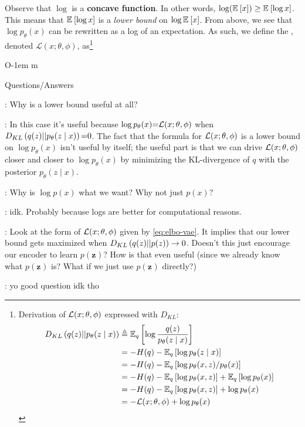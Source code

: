 \documentclass[11pt]{article}
\renewcommand\vec[2][]{\bm{#2}_{#1}}
\newcommand\QA[2]{\item \red{Q}: #1
	\begin{compactitem}
		\item \green{A}: #2
	\end{compactitem}}
\begin{document}
Observe that $\log$ is a \textbf{concave function}. In other words, $\log(\E{x}) \ge \E{\log x}$. This means that $\E{\log x}$ is a \textit{lower bound} on $\log \E{x}$. From above, we see that $\log p_{\theta}(x)$ can be rewritten as a log of an expectation. As such, we define the , denoted $\mathcal L(x; \theta, \phi)$, as\footnote{Derivation of $\elbo$ expressed with $D_{KL}$:
\begin{align}
	\dkl{q(z)}{p_{\theta}(z \mid x)}
		&\triangleq \E[q]{\log \frac{q(z)}{p_{\theta}(z \mid x)}} \\
		&= - H(q) - \E[q]{\log p_{\theta}(z  \mid x)} \\
		&= - H(q) - \E[q]{\log p_{\theta}(x, z) / p_{\theta}(x)} \\
		&= - H(q) - \E[q]{\log p_{\theta}(x, z)} + \E[q]{\log p_{\theta}(x)} \\
		&= - H(q) - \E[q]{\log p_{\theta}(x, z)} + \log p_{\theta}(x) \\
		&= -\elbo + \log p_{\theta}(x)
\end{align}
}

{O{-1em} m} %
{ 	%
	 \vspace*{#1}
	\begin{quote}
		\small
		\begin{compactitem}[\gray{\RIGHTarrow}]
		}{ %
		\end{compactitem}
	\end{quote}
}


\begin{itemdefinition}{Questions/Answers}
\QA{Why is a lower bound useful at all?}{
	In this case it's useful because $\log p_{\theta}(x) \eq \elbo$ when $\dkl{q(z)}{p_{\theta}(z \mid x)} \eq 0$. The fact that the formula for $\elbo$ is a lower bound on $\log p_{\theta}(x)$ isn't useful by itself; the useful part is that we can drive $\elbo$ closer and closer to  $\log p_{\theta}(x)$ by minimizing the KL-divergence of $q$ with the posterior $p_{\theta}(z \mid x)$.}

\QA{Why is $\log p(x)$ what we want? Why not just $p(x)$?}{
	idk. Probably because logs are better for computational reasons.}

\QA{Look at the form of $\elbo$ given by \ref{eq:elbo-vae}. It implies that our lower bound gets maximized when $\dkl{q(z)}{p(z)} \rightarrow 0$. Doesn't this just encourage our encoder to learn $p(\vec z)$? How is that even useful (since we already know what $p(\vec z)$ is? What if we just use $p(\vec z)$ directly?)}{
	yo good question idk tho}
\end{itemdefinition}
\end{document}
